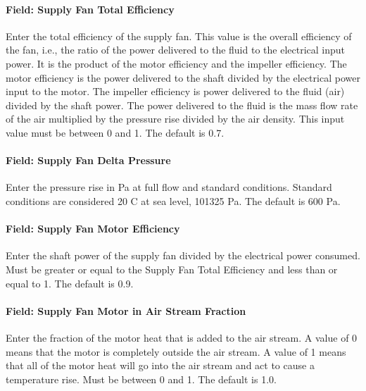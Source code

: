 \paragraph{Field: Supply Fan Total Efficiency}\label{field-supply-fan-total-efficiency-6}

Enter the total efficiency of the supply fan. This value is the overall efficiency of the fan, i.e., the ratio of the power delivered to the fluid to the electrical input power. It is the product of the motor efficiency and the impeller efficiency. The motor efficiency is the power delivered to the shaft divided by the electrical power input to the motor. The impeller efficiency is power delivered to the fluid (air) divided by the shaft power. The power delivered to the fluid is the mass flow rate of the air multiplied by the pressure rise divided by the air density. This input value must be between 0 and 1. The default is 0.7.

\paragraph{Field: Supply Fan Delta Pressure}\label{field-supply-fan-delta-pressure-5}

Enter the pressure rise in Pa at full flow and standard conditions. Standard conditions are considered 20 C at sea level, 101325 Pa. The default is 600 Pa.

\paragraph{Field: Supply Fan Motor Efficiency}\label{field-supply-fan-motor-efficiency-6}

Enter the shaft power of the supply fan divided by the electrical power consumed. Must be greater or equal to the Supply Fan Total Efficiency and less than or equal to 1. The default is 0.9.

\paragraph{Field: Supply Fan Motor in Air Stream Fraction}\label{field-supply-fan-motor-in-air-stream-fraction-2}

Enter the fraction of the motor heat that is added to the air stream. A value of 0 means that the motor is completely outside the air stream. A value of 1 means that all of the motor heat will go into the air stream and act to cause a temperature rise. Must be between 0 and 1. The default is 1.0.


